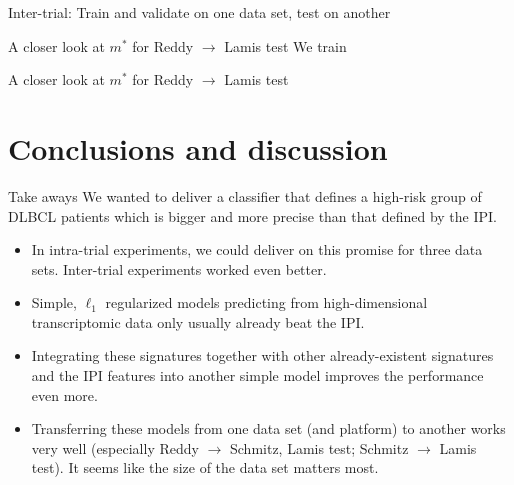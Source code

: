 \documentclass[10pt, aspectratio=169]{beamer}
\begin{document}
\begin{frame}{Inter-trial: Train and validate on one data set, test on another}
  
\end{frame}

\begin{frame}{A closer look at $m^*$ for Reddy $\to$ Lamis test}
  We train
\end{frame}

\begin{frame}{A closer look at $m^*$ for Reddy $\to$ Lamis test}
  
\end{frame}

\section{Conclusions and discussion}
\begin{frame}{Take aways}
  We wanted to deliver a classifier that defines a high-risk group of DLBCL 
  patients which is bigger and more precise than that defined by the IPI.
  \begin{itemize}
    \item In intra-trial experiments, we could deliver on this promise for three 
      data sets. Inter-trial experiments worked even better.
    \pause
    \item Simple, $\ell_1$ regularized models predicting from high-dimensional 
      transcriptomic data only usually already beat the IPI.
    \pause
    \item Integrating these signatures together with other already-existent 
      signatures and the IPI features into another simple model improves the 
      performance even more.
    \pause
    \item Transferring these models from one data set (and platform) to another
      works very well (especially Reddy $\to$ Schmitz, Lamis test; Schmitz $\to$ 
      Lamis test). It seems like the size of the data set matters most.
  \end{itemize}
\end{frame}
\end{document}
